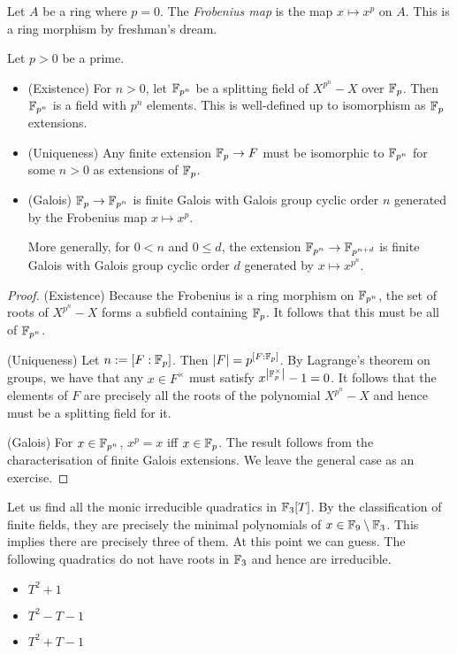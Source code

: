 \documentclass{article}
\begin{document}
\begin{dfn}
  
  Let $A$ be a ring where $p = 0$.
  The \emph{Frobenius map} is the map $x \mapsto x^p$ on $A$.
  This is a ring morphism by freshman's dream.
\end{dfn}

\begin{prop}
  
  Let $p > 0$ be a prime.
  \begin{itemize}
    \item (Existence) For $n > 0$,
    let $\mathbb{F}_{p^n}$ be a splitting field of $X^{p^n} - X$ over $\mathbb{F}_p$.
    Then $\mathbb{F}_{p^n}$ is a field with $p^n$ elements.
    This is well-defined up to isomorphism as $\mathbb{F}_p$ extensions.

    \item (Uniqueness) Any finite extension $\mathbb{F}_p \to F$
    must be isomorphic to $\mathbb{F}_{p^n}$ for some $n > 0$
    as extensions of $\mathbb{F}_p$.

    \item (Galois) $\mathbb{F}_p \to \mathbb{F}_{p^n}$ is finite Galois
    with Galois group cyclic order $n$ generated by 
    the Frobenius map $x \mapsto x^p$.

    More generally, for $0 < n$ and $0 \leq d$,
    the extension $\mathbb{F}_{p^{n}} \to \mathbb{F}_{p^{n + d}}$ is finite Galois
    with Galois group cyclic order $d$ generated by
    $x \mapsto x^{p^n}$.
  \end{itemize}
\end{prop}
\begin{proof}
  (Existence) Because the Frobenius is a ring morphism on $\mathbb{F}_{p^n}$,
  the set of roots of $X^{p^n} - X$ forms a subfield containing $\mathbb{F}_p$.
  It follows that this must be all of $\mathbb{F}_{p^n}$.

  (Uniqueness) Let $n := [F : \mathbb{F}_p]$.
  Then $\left\vert F \right\vert = p^{[F : \mathbb{F}_p]}$.
  By Lagrange's theorem on groups,
  we have that any $x \in F^\times$ must satisfy 
  $x^{\left\vert \mathbb{F}_p^\times \right\vert} - 1 = 0$.
  It follows that the elements of $F$ are precisely all the roots of 
  the polynomial $X^{p^{n}} - X$
  and hence must be a splitting field for it.

  (Galois) For $x \in \mathbb{F}_{p^n}$,
  $x^p = x$ iff $x \in \mathbb{F}_p$.
  The result follows from the characterisation of finite Galois extensions.
  We leave the general case as an exercise.
\end{proof}

\begin{eg}
  Let us find all the monic irreducible quadratics in $\mathbb{F}_3[T]$.
  By the classification of finite fields,
  they are precisely the minimal polynomials of
  $x \in \mathbb{F}_9 \setminus \mathbb{F}_3$.
  This implies there are precisely three of them.
  At this point we can guess.
  The following quadratics do not have roots in $\mathbb{F}_3$ and
  hence are irreducible.
  \begin{itemize}
    \item $T^2 + 1$
    \item $T^2 - T - 1$
    \item $T^2 + T - 1$
  \end{itemize}
\end{eg}
\end{document}
